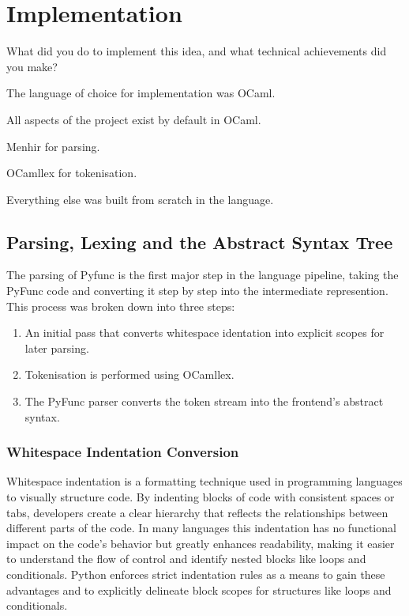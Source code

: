 \documentclass{l4proj}
\begin{document}
\chapter{Implementation}
What did you do to implement this idea, and what technical achievements did you make?

The language of choice for implementation was OCaml.

All aspects of the project exist by default in OCaml.

Menhir for parsing.

OCamllex for tokenisation.

Everything else was built from scratch in the language.

\section{Parsing, Lexing and the Abstract Syntax Tree} \label{sec:parsing-lexing-and-the-ast}


The parsing of Pyfunc is the first major step in the language pipeline, taking the PyFunc code and converting it step by step into the intermediate represention.
This process was broken down into three steps:
\begin{enumerate}
    \item An initial pass that converts whitespace identation into explicit scopes for later parsing.
    \item Tokenisation is performed using OCamllex.
    \item The PyFunc parser converts the token stream into the frontend's abstract syntax.
\end{enumerate}

\subsection{Whitespace Indentation Conversion}

Whitespace indentation is a formatting technique used in programming languages to visually structure code.
By indenting blocks of code with consistent spaces or tabs, developers create a clear hierarchy that reflects the relationships between different parts of the code.
In many languages this indentation has no functional impact on the code's behavior but greatly enhances readability, making it easier to understand the flow of control and identify nested blocks like loops and conditionals.
Python enforces strict indentation rules as a means to gain these advantages and to explicitly delineate block scopes for structures like loops and conditionals.
\end{document}

